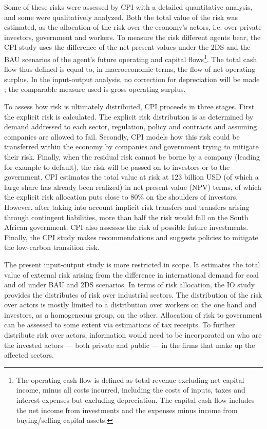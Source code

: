 \documentclass[12pt,english]{article}
\begin{document}
Some of these risks were assessed by CPI with a detailed quantitative analysis, and some were qualitatively analyzed. Both the total value of the risk was estimated, as the allocation of the risk over the economy's actors, i.e. over private investors, government and workers. To measure the risk different agents bear, the CPI study uses the difference of the net present values under the 2DS and the BAU scenarios of the agent's future operating and capital flows\footnote{The operating cash flow is defined as total revenue excluding net capital income, minus all costs incurred, including the costs of inputs, taxes and interest expenses but excluding depreciation. The capital cash flow includes the net income from investments and the expenses minus income from buying/selling capital assets.}. The total cash flow thus defined is equal to, in macroeconomic terms, the flow of net operating surplus. In the input-output analysis, no correction for depreciation will be made ; the comparable measure used is gross operating surplus.

To assess how risk is ultimately distributed, CPI proceeds in three stages. First the explicit risk is calculated. The explicit risk distribution is as determined by demand addressed to each sector, regulation, policy and contracts and assuming companies are allowed to fail. Secondly, CPI models how this risk could be transferred within the economy by companies and government trying to mitigate their risk. Finally, when the residual risk cannot be borne by a company (leading for example to default), the risk will be passed on to investors or to the government. 
CPI estimates the total value at risk at 123 billion USD (of which a large share has already been realized) in net present value (NPV) terms, of which the explicit risk allocation puts close to 80\% on the shoulders of investors. However, after taking into account implicit risk transfers and transfers arising through contingent liabilities, more than half the risk would fall on the South African government. CPI also assesses the risk of possible future investments. Finally, the CPI study makes recommendations and suggests policies to mitigate the low-carbon transition risk.

The present input-output study is more restricted in scope. It estimates the total value of external risk arising from the difference in international demand for coal and oil under BAU and 2DS scenarios. In terms of risk allocation, the IO study provides the distributes of risk over industrial sectors. The distribution of the risk over actors is mostly limited to a distribution over workers on the one hand and investors, as a homogeneous group, on the other. Allocation of risk to government can be assessed to some extent via estimations of tax receipts. To further distribute risk over actors, information would need to be incorporated on who are the invested actors --- both private and public --- in the firms that make up the affected sectors. 
\end{document}
